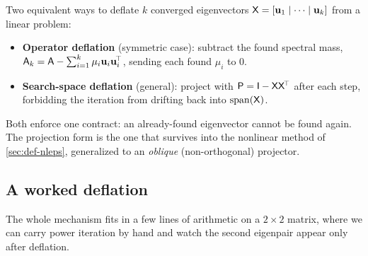 \begin{notationbox}
Two equivalent ways to deflate $k$ converged eigenvectors $\mathsf{X}=[\mathbf{u}_1\mid
\cdots\mid\mathbf{u}_k]$ from a linear problem:
\begin{itemize}[nosep]
  \item \textbf{Operator deflation} (symmetric case): subtract the found spectral
  mass, $\mathsf{A}_k=\mathsf{A}-\sum_{i=1}^k\mu_i\mathbf{u}_i\mathbf{u}_i^{\!\top}$, sending each found
  $\mu_i$ to $0$.
  \item \textbf{Search-space deflation} (general): project with
  $\mathsf{P}=\mathsf{I}-\mathsf{X}\mathsf{X}^{\!\top}$ after each step, forbidding the
  iteration from drifting back into $\operatorname{span}(\mathsf{X})$.
\end{itemize}
Both enforce one contract: an already-found eigenvector cannot be found again.
The projection form is the one that survives into the nonlinear method of
\cref{sec:def-nleps}, generalized to an \emph{oblique} (non-orthogonal) projector.
\end{notationbox}

\subsection{A worked deflation}
\label{sec:def-worked1}

The whole mechanism fits in a few lines of arithmetic on a $2\times2$ matrix,
where we can carry power iteration by hand and watch the second eigenpair appear
only after deflation.

